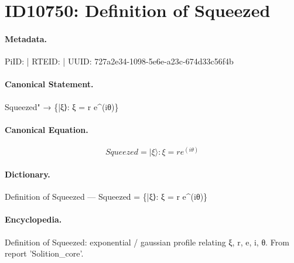 \section*{ID10750: Definition of Squeezed}
\paragraph{Metadata.}
PiID:  | RTEID:  | UUID: 727a2e34-1098-5e6e-a23c-674d33c56f4b

\paragraph{Canonical Statement.}
Squeezed" → \{|ξ⟩: ξ = r e\textasciicircum{}(iθ)\}

\paragraph{Canonical Equation.}
\[
Squeezed = {|ξ⟩: ξ = r e^(iθ)}
\]

\paragraph{Dictionary.}
Definition of Squeezed — Squeezed = \{|ξ⟩: ξ = r e\textasciicircum{}(iθ)\}

\paragraph{Encyclopedia.}
Definition of Squeezed: exponential / gaussian profile relating ξ, r, e, i, θ. From report 'Solition\_core'.

